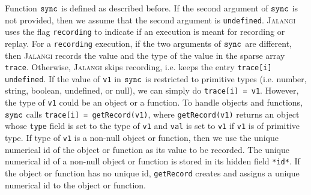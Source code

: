 \documentclass{sig-alternate}
\def\jalangi{\textsc{Jalangi}}
\newcommand \dsl [1] {\ensuremath{{\tt #1}}\xspace}
\newcommand \Sync{\dsl{sync}}
\begin{document}
Function $\Sync$ is defined as described before.  If the second
argument of $\Sync$ is not provided, then we assume that the second
argument is \texttt{undefined}.  \jalangi{} uses the flag
\texttt{recording} to indicate if an execution is meant for recording
or replay.  For a \texttt{recording} execution, if the two arguments
of $\Sync$ are different, then \jalangi{} records the value and the
type of the value in the sparse array \texttt{trace}.  Otherwise,
\jalangi{} skips recording, i.e. keeps the entry \texttt{trace[i]}
\texttt{undefined}.  If the value of \texttt{v1} in $\Sync$ is
restricted to primitive types (i.e. number, string, boolean,
undefined, or null), we can simply do \texttt{trace[i] = v1}.
However, the type of \texttt{v1} could be an object or a function.  To
handle objects and functions, $\Sync$ calls \texttt{trace[i] =
  getRecord(v1)}, where \texttt{getRecord(v1)} returns an object whose
\texttt{type} field is set to the type of \texttt{v1} and \texttt{val}
is set to \texttt{v1} if \texttt{v1} is of primitive type.  If type of
\texttt{v1} is a non-null object or function, then we use the unique
numerical id of the object or function as its value to be recorded.
The unique numerical id of a non-null object or function is stored in
its hidden field \texttt{*id*}.  If the object or function has no
unique id, \texttt{getRecord} creates and assigns a unique numerical
id to the object or function.
\end{document}
